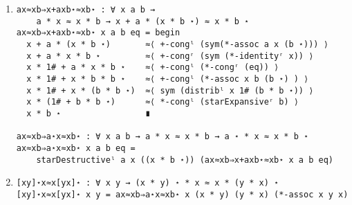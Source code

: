 \begin{enumerate}
\begin{verbatim}
x≈y⇒x⋆≈y⋆ : ∀ x y → x ≈ y → x ⋆ ≈ y ⋆
x≈y⇒x⋆≈y⋆ x y eq = begin
  x ⋆       ≈⟨ sym (*-identityʳ (x ⋆)) ⟩
  x ⋆ * 1#  ≈⟨ (starDestructiveˡ x 1# (y ⋆) (x≈y⇒1+xy⋆≈y⋆ x y eq)) ⟩
  y ⋆       ∎
\end{verbatim}
\item
\begin{verbatim}
ax≈xb⇒x+axb⋆≈xb⋆ : ∀ x a b → 
	a * x ≈ x * b → x + a * (x * b ⋆) ≈ x * b ⋆
ax≈xb⇒x+axb⋆≈xb⋆ x a b eq = begin
  x + a * (x * b ⋆)       ≈⟨ +-congˡ (sym(*-assoc a x (b ⋆))) ⟩
  x + a * x * b ⋆         ≈⟨ +-congʳ (sym (*-identityʳ x)) ⟩
  x * 1# + a * x * b ⋆    ≈⟨ +-congˡ (*-congʳ (eq)) ⟩
  x * 1# + x * b * b ⋆    ≈⟨ +-congˡ (*-assoc x b (b ⋆) ) ⟩
  x * 1# + x * (b * b ⋆)  ≈⟨ sym (distribˡ x 1# (b * b ⋆)) ⟩
  x * (1# + b * b ⋆)      ≈⟨ *-congˡ (starExpansiveʳ b) ⟩
  x * b ⋆                 ∎

ax≈xb⇒a⋆x≈xb⋆ : ∀ x a b → a * x ≈ x * b → a ⋆ * x ≈ x * b ⋆
ax≈xb⇒a⋆x≈xb⋆ x a b eq = 
	starDestructiveˡ a x ((x * b ⋆)) (ax≈xb⇒x+axb⋆≈xb⋆ x a b eq)
\end{verbatim}
\item
\begin{verbatim}
[xy]⋆x≈x[yx]⋆ : ∀ x y → (x * y) ⋆ * x ≈ x * (y * x) ⋆
[xy]⋆x≈x[yx]⋆ x y = ax≈xb⇒a⋆x≈xb⋆ x (x * y) (y * x) (*-assoc x y x)
\end{verbatim}
\end{enumerate}
